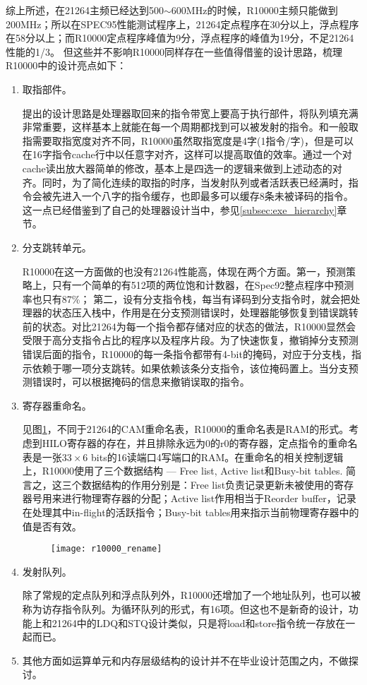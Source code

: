 综上所述，在21264主频已经达到500$ \sim $600MHz的时候，R10000主频只能做到200MHz；所以在SPEC95性能测试程序上，21264定点程序在30分以上，浮点程序在58分以上；而R10000定点程序峰值为9分，浮点程序的峰值为19分，不足21264性能的1/3\citep{Alpha21264,MIPS1996}。 但这些并不影响R10000同样存在一些值得借鉴的设计思路，梳理R10000中的设计亮点如下：
\begin{enumerate}[label=(\alph*)]
	\item 取指部件。
	
	\citet{MIPS1996}提出的设计思路是处理器取回来的指令带宽上要高于执行部件，将队列填充满非常重要，这样基本上就能在每一个周期都找到可以被发射的指令。和一般取指需要取指宽度对齐不同，R10000虽然取指宽度是4字(1指令/字)，但是可以在16字指令cache行中以任意字对齐，这样可以提高取值的效率。通过一个对cache读出放大器简单的修改，基本上是四选一的逻辑来做到上述动态的对齐。同时，为了简化连续的取指的时序，当发射队列或者活跃表已经满时，指令会被先进入一个八字的指令缓存\citep{MIPS1996}，也即最多可以缓存8条未被译码的指令。这一点已经借鉴到了自己的处理器设计当中，参见\ref{subsec:exe_hierarchy}章节。
	\item 分支跳转单元。
	
	R10000在这一方面做的也没有21264性能高，体现在两个方面。第一，预测策略上，只有一个简单的有512项的两位饱和计数器，在Spec92整点程序中预测率也只有87\%\citep{MIPS1996}； 第二，设有分支指令栈，每当有译码到分支指令时，就会把处理器的状态压入栈中，作用是在分支预测错误时，处理器能够恢复到错误跳转前的状态。对比21264为每一个指令都存储对应的状态的做法，R10000显然会受限于高分支指令占比的程序以及程序片段。为了快速恢复，撤销掉分支预测错误后面的指令，R10000的每一条指令都带有4-bit的掩码，对应于分支栈，指示依赖于哪一项分支跳转。如果依赖该条分支指令，该位掩码置上。当分支预测错误时，可以根据掩码的信息来撤销误取的指令。
	\item 寄存器重命名。
	
	见图\ref{fig:r10000_rename}，不同于21264的CAM重命名表，R10000的重命名表是RAM的形式。考虑到HILO寄存器的存在，并且排除永远为$ 0 $的r0的寄存器，定点指令的重命名表是一张$ 33\times 6 $ bits的16读端口4写端口的RAM\citep{MIPS1996}。在重命名的相关控制逻辑上，R10000使用了三个数据结构 --- Free list, Active list和Busy-bit tables. 简言之，这三个数据结构的作用分别是：Free list负责记录更新未被使用的寄存器号用来进行物理寄存器的分配；Active list作用相当于Reorder buffer，记录在处理其中in-flight的活跃指令；Busy-bit tables用来指示当前物理寄存器中的值是否有效。
	\begin{figure}[!htbp]
		\centering
		\texttt{[image: r10000\_rename]}
		\label{fig:r10000_rename}
	\end{figure}
	
	\item 发射队列。
	
	除了常规的定点队列和浮点队列外，R10000还增加了一个地址队列，也可以被称为访存指令队列。为循环队列的形式，有16项。但这也不是新奇的设计，功能上和21264中的LDQ和STQ设计类似，只是将load和store指令统一存放在一起而已。
	\item 其他方面如运算单元和内存层级结构的设计并不在毕业设计范围之内，不做探讨。
\end{enumerate}

